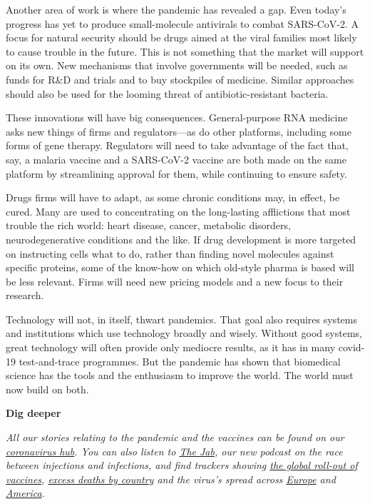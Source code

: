 \documentclass{article}
\begin{document}
Another area of work is where the pandemic has revealed a gap. Even today's progress has yet to produce small-molecule antivirals to combat SARS-CoV-2. A focus for natural security should be drugs aimed at the viral families most likely to cause trouble in the future. This is not something that the market will support on its own. New mechanisms that involve governments will be needed, such as funds for R\&D and trials and to buy stockpiles of medicine. Similar approaches should also be used for the looming threat of antibiotic-resistant bacteria. 

These innovations will have big consequences. General-purpose RNA medicine asks new things of firms and regulators---as do other platforms, including some forms of gene therapy. Regulators will need to take advantage of the fact that, say, a malaria vaccine and a SARS-CoV-2 vaccine are both made on the same platform by streamlining approval for them, while continuing to ensure safety. 

Drugs firms will have to adapt, as some chronic conditions may, in effect, be cured. Many are used to concentrating on the long-lasting afflictions that most trouble the rich world: heart disease, cancer, metabolic disorders, neurodegenerative conditions and the like. If drug development is more targeted on instructing cells what to do, rather than finding novel molecules against specific proteins, some of the know-how on which old-style pharma is based will be less relevant. Firms will need new pricing models and a new focus to their research. 

Technology will not, in itself, thwart pandemics. That goal also requires systems and institutions which use technology broadly and wisely. Without good systems, great technology will often provide only mediocre results, as it has in many covid-19 test-and-trace programmes. But the pandemic has shown that biomedical science has the tools and the enthusiasm to improve the world. The world must now build on both. {} 

\textbf{Dig deeper} 

\emph{All our stories relating to the pandemic and the vaccines can be found on our \href{/news/2020/03/11/the-economists-coverage-of-the-coronavirus}{coronavirus hub}. You can also listen to \href{/podcasts/the-jab-a-new-podcast-from-the-economist}{The Jab}, our new podcast on the race between injections and infections, and find trackers showing \href{https://www.economist.com/graphic-detail/tracking-coronavirus-across-the-world}{the global roll-out of vaccines}, \href{https://www.economist.com/graphic-detail/coronavirus-excess-deaths-tracker}{excess deaths by country} and the virus's spread across \href{https://www.economist.com/graphic-detail/tracking-coronavirus-across-europe}{Europe} and \href{https://www.economist.com/graphic-detail/tracking-coronavirus-across-america}{America}.} 
\clearpage
\end{document}
